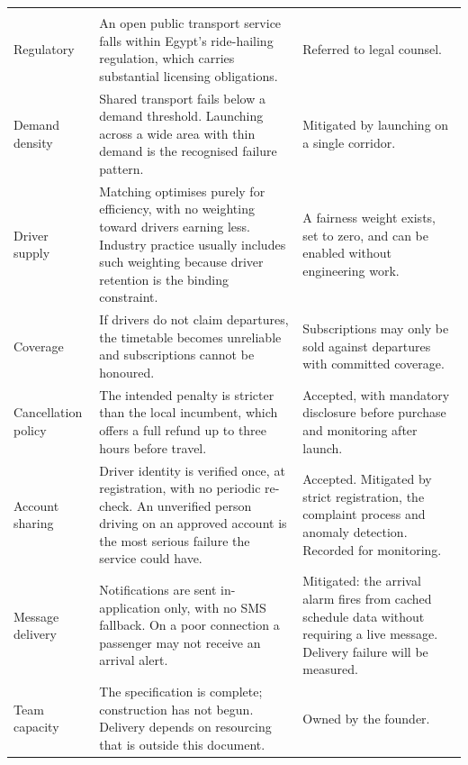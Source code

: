 \begin{longtable}{@{}L{27mm}L{72mm}L{47mm}@{}}
\toprule
{} &  &  \\
\midrule
\endfirsthead
\toprule
{} &  &  \\
\midrule
\endhead
\bottomrule
\endfoot
Regulatory & An open public transport service falls within Egypt's ride-hailing regulation, which carries substantial licensing obligations. & Referred to legal counsel. \\
Demand density & Shared transport fails below a demand threshold. Launching across a wide area with thin demand is the recognised failure pattern. & Mitigated by launching on a single corridor. \\
Driver supply & Matching optimises purely for efficiency, with no weighting toward drivers earning less. Industry practice usually includes such weighting because driver retention is the binding constraint. & A fairness weight exists, set to zero, and can be enabled without engineering work. \\
Coverage & If drivers do not claim departures, the timetable becomes unreliable and subscriptions cannot be honoured. & Subscriptions may only be sold against departures with committed coverage. \\
Cancellation policy & The intended penalty is stricter than the local incumbent, which offers a full refund up to three hours before travel. & Accepted, with mandatory disclosure before purchase and monitoring after launch. \\
Account sharing & Driver identity is verified once, at registration, with no periodic re-check. An unverified person driving on an approved account is the most serious failure the service could have. & Accepted. Mitigated by strict registration, the complaint process and anomaly detection. Recorded for monitoring. \\
Message delivery & Notifications are sent in-application only, with no SMS fallback. On a poor connection a passenger may not receive an arrival alert. & Mitigated: the arrival alarm fires from cached schedule data without requiring a live message. Delivery failure will be measured. \\
Team capacity & The specification is complete; construction has not begun. Delivery depends on resourcing that is outside this document. & Owned by the founder. \\
\end{longtable}


